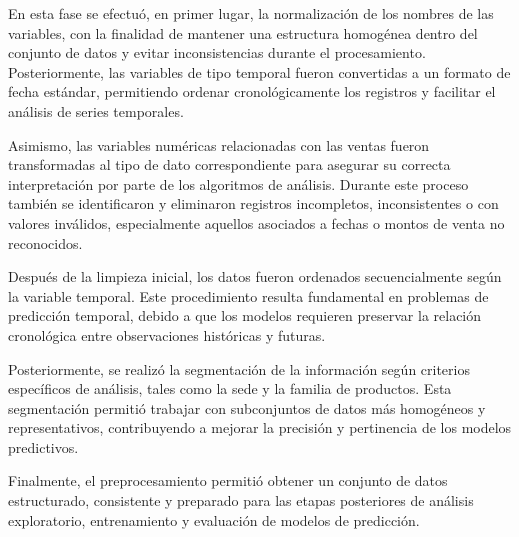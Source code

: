 En esta fase se efectuó, en primer lugar, la normalización de los nombres de las variables, con la finalidad de mantener una estructura homogénea dentro del conjunto de datos y evitar inconsistencias durante el procesamiento. Posteriormente, las variables de tipo temporal fueron convertidas a un formato de fecha estándar, permitiendo ordenar cronológicamente los registros y facilitar el análisis de series temporales.

Asimismo, las variables numéricas relacionadas con las ventas fueron transformadas al tipo de dato correspondiente para asegurar su correcta interpretación por parte de los algoritmos de análisis. Durante este proceso también se identificaron y eliminaron registros incompletos, inconsistentes o con valores inválidos, especialmente aquellos asociados a fechas o montos de venta no reconocidos.

Después de la limpieza inicial, los datos fueron ordenados secuencialmente según la variable temporal. Este procedimiento resulta fundamental en problemas de predicción temporal, debido a que los modelos requieren preservar la relación cronológica entre observaciones históricas y futuras.

Posteriormente, se realizó la segmentación de la información según criterios específicos de análisis, tales como la sede y la familia de productos. Esta segmentación permitió trabajar con subconjuntos de datos más homogéneos y representativos, contribuyendo a mejorar la precisión y pertinencia de los modelos predictivos.

Finalmente, el preprocesamiento permitió obtener un conjunto de datos estructurado, consistente y preparado para las etapas posteriores de análisis exploratorio, entrenamiento y evaluación de modelos de predicción.
		
		
		

